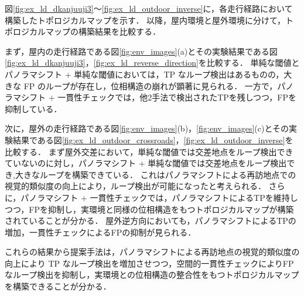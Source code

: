 \documentclass[conference]{IEEEtran}
\begin{document}
図\ref{fig:ex_ld_dkanjuuji3}〜\ref{fig:ex_ld_outdoor_inverse}に，各走行経路において構築したトポロジカルマップを示す．
以降，屋内環境と屋外環境に分けて，トポロジカルマップの構築結果を比較する．

まず，屋内の走行経路である図\ref{fig:env_images}(a)とその実験結果である図\ref{fig:ex_ld_dkanjuuji3}，\ref{fig:ex_ld_reverse_direction}を比較する．
単純な閾値とパノラマシフト + 単純な閾値においては，TP なループ検出はあるものの，大きな FP のループが存在し，位相構造の崩れが顕著に見られる．
一方で，パノラマシフト + 一貫性チェックでは，他2手法で検出されたTPを残しつつ，FPを抑制している．

次に，屋外の走行経路である図\ref{fig:env_images}(b)，\ref{fig:env_images}(c)とその実験結果である図\ref{fig:ex_ld_outdoor_crossroads}，\ref{fig:ex_ld_outdoor_inverse}を比較する．
まず屋外交差において，単純な閾値では交差地点をループ検出できていないのに対し，パノラマシフト + 単純な閾値では交差地点をループ検出でき,大きなループを構築できている．
これはパノラマシフトによる再訪地点での視覚的類似度の向上により，ループ検出が可能になったと考えられる．
さらに，パノラマシフト + 一貫性チェックでは，パノラマシフトによるTPを維持しつつ，FPを抑制し，実環境と同様の位相構造をもつトポロジカルマップが構築されていることが分かる．
屋外逆方向においても，パノラマシフトによるTPの増加，一貫性チェックによるFPの抑制が見られる．

これらの結果から提案手法は，パノラマシフトによる再訪地点の視覚的類似度の向上により TP なループ検出を増加させつつ，空間的一貫性チェックによりFPなループ検出を抑制し，実環境との位相構造の整合性をもつトポロジカルマップを構築できることが分かる．
\end{document}
